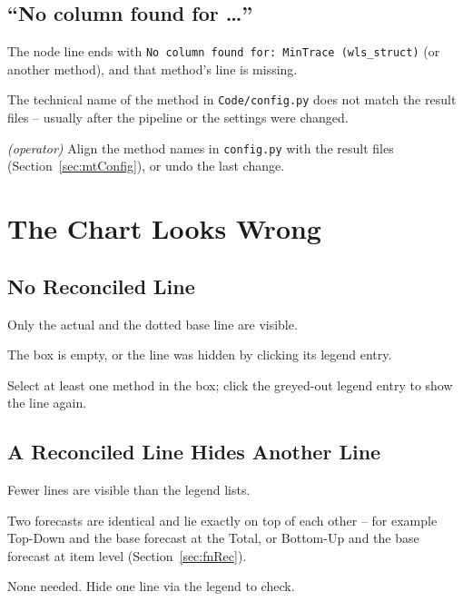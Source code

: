 \subsection{``No column found for \dots''}
\label{sec:tsNoColumn}

\begin{description}[style=nextline,leftmargin=0.5cm,font=\normalfont\bfseries]
  \item[Symptom] The node line ends with \texttt{No column found for: MinTrace (wls\_struct)} (or another method), and that method's line is missing.
  \item[Cause] The technical name of the method in \texttt{Code/config.py} does not match the result files -- usually after the pipeline or the settings were changed.
  \item[Solution] \emph{(operator)} Align the method names in \texttt{config.py} with the result files (Section~\ref{sec:mtConfig}), or undo the last change.
\end{description}

\section{The Chart Looks Wrong}
\label{sec:tsChartGroup}

\subsection{No Reconciled Line}
\label{sec:tsNoRecLine}

\begin{description}[style=nextline,leftmargin=0.5cm,font=\normalfont\bfseries]
  \item[Symptom] Only the actual and the dotted base line are visible.
  \item[Cause] The  box is empty, or the line was hidden by clicking its legend entry.
  \item[Solution] Select at least one method in the box; click the greyed-out legend entry to show the line again.
\end{description}

\subsection{A Reconciled Line Hides Another Line}
\label{sec:tsOverlap}

\begin{description}[style=nextline,leftmargin=0.5cm,font=\normalfont\bfseries]
  \item[Symptom] Fewer lines are visible than the legend lists.
  \item[Cause] Two forecasts are identical and lie exactly on top of each other -- for example Top-Down and the base forecast at the Total, or Bottom-Up and the base forecast at item level (Section~\ref{sec:fnRec}).
  \item[Solution] None needed. Hide one line via the legend to check.
\end{description}

